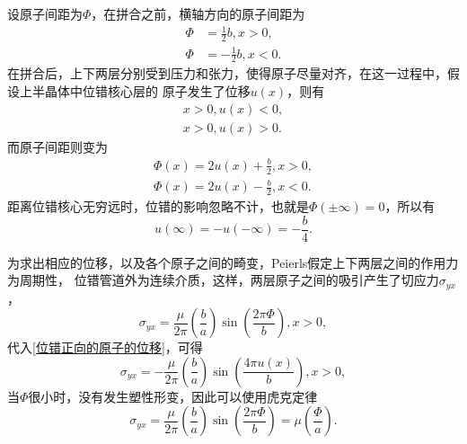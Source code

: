                 设原子间距为$\Phi$，在拼合之前，横轴方向的原子间距为
                \begin{equation}
                    \begin{aligned}
                        \Phi&=\frac{1}{2}b,x>0,\\
                        \Phi&=-\frac{1}{2}b,x<0.
                    \end{aligned}
                \end{equation}
                在拼合后，上下两层分别受到压力和张力，使得原子尽量对齐，在这一过程中，假设上半晶体中位错核心层的
                原子发生了位移$u(x)$，则有
                \begin{equation}
                    \begin{aligned}
                        x>0,u(x)<0,\\
                        x>0,u(x)>0.
                    \end{aligned}
                \end{equation}
                而原子间距则变为
                \begin{align}
                    \Phi(x)=2u(x)+\frac{b}{2},x>0\label{位错正向的原子的位移},\\
                    \Phi(x)=2u(x)-\frac{b}{2},x<0.
                \end{align}
                距离位错核心无穷远时，位错的影响忽略不计，也就是$\Phi(\pm\infty)=0$，所以有
                \begin{equation}
                    u(\infty)=-u(-\infty)=-\frac{b}{4}.
                \end{equation}
                

                为求出相应的位移，以及各个原子之间的畸变，Peierls假定上下两层之间的作用力为周期性，
                位错管道外为连续介质，这样，两层原子之间的吸引产生了切应力$\sigma_{yx}$，
                \begin{equation}
                    \sigma_{yx}=\frac{\mu}{2\pi}\left( \frac{b}{a} \right)\sin\left( \frac{2\pi\Phi}{b} \right),x>0,
                \end{equation}
                代入\autoref{位错正向的原子的位移}，可得
                \begin{equation}
                    \sigma_{yx}=-\frac{\mu}{2\pi}\left( \frac{b}{a} \right)\sin\left( \frac{4\pi u(x)}{b} \right),x>0,                    
                \end{equation}
                当$\Phi$很小时，没有发生塑性形变，因此可以使用虎克定律
                \begin{equation}
                    \sigma_{yx}=\frac{\mu}{2\pi}\left( \frac{b}{a} \right)\sin\left( \frac{2\pi\Phi}{b} \right)=\mu\left( \frac{\Phi}{a} \right)\label{刃位错核心引起的切应力公式1}.
                \end{equation}

